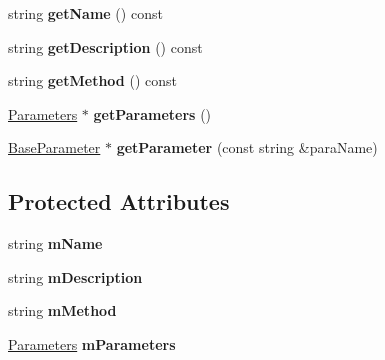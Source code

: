 \begin{DoxyCompactItemize}
\item 
\hypertarget{classrrp_1_1_capability_a5e164ba33b1dfc211559756aa5d486c0}{string {\bfseries get\-Name} () const }\label{classrrp_1_1_capability_a5e164ba33b1dfc211559756aa5d486c0}

\item 
\hypertarget{classrrp_1_1_capability_a2c1ef8f0b4bd34b381de63dc9a390203}{string {\bfseries get\-Description} () const }\label{classrrp_1_1_capability_a2c1ef8f0b4bd34b381de63dc9a390203}

\item 
\hypertarget{classrrp_1_1_capability_ad021e4c24356da2da4acc1b474e020fe}{string {\bfseries get\-Method} () const }\label{classrrp_1_1_capability_ad021e4c24356da2da4acc1b474e020fe}

\item 
\hypertarget{classrrp_1_1_capability_afdb53c6c03feb3a07e2d96d98007ad57}{\hyperlink{classrrp_1_1_parameters}{Parameters} $\ast$ {\bfseries get\-Parameters} ()}\label{classrrp_1_1_capability_afdb53c6c03feb3a07e2d96d98007ad57}

\item 
\hypertarget{classrrp_1_1_capability_a3313ee15c4be475bbfe6f34e3590f8d6}{\hyperlink{classrrp_1_1_base_parameter}{Base\-Parameter} $\ast$ {\bfseries get\-Parameter} (const string \&para\-Name)}\label{classrrp_1_1_capability_a3313ee15c4be475bbfe6f34e3590f8d6}

\end{DoxyCompactItemize}
\subsection*{Protected Attributes}
\begin{DoxyCompactItemize}
\item 
\hypertarget{classrrp_1_1_capability_a1e458281effaffe16418036bea0ca965}{string {\bfseries m\-Name}}\label{classrrp_1_1_capability_a1e458281effaffe16418036bea0ca965}

\item 
\hypertarget{classrrp_1_1_capability_aeae892c98725d57e94ef8d8d2eee7477}{string {\bfseries m\-Description}}\label{classrrp_1_1_capability_aeae892c98725d57e94ef8d8d2eee7477}

\item 
\hypertarget{classrrp_1_1_capability_a08a4c04b53d5d4875fd80886453c3247}{string {\bfseries m\-Method}}\label{classrrp_1_1_capability_a08a4c04b53d5d4875fd80886453c3247}

\item 
\hypertarget{classrrp_1_1_capability_a64adade8cc1302a570954596ea10681c}{\hyperlink{classrrp_1_1_parameters}{Parameters} {\bfseries m\-Parameters}}\label{classrrp_1_1_capability_a64adade8cc1302a570954596ea10681c}

\end{DoxyCompactItemize}
